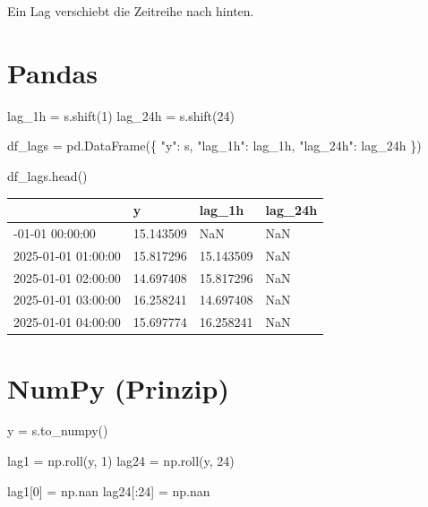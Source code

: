 \documentclass[
  ngerman,
  letterpaper,
  DIV=11]{scrreprt}
\newenvironment{Shaded}{\begin{snugshade}}{\end{snugshade}}
\newcommand{\DecValTok}[1]{\textcolor[rgb]{0.68,0.00,0.00}{#1}}
\newcommand{\NormalTok}[1]{\textcolor[rgb]{0.00,0.23,0.31}{#1}}
\newcommand{\OperatorTok}[1]{\textcolor[rgb]{0.37,0.37,0.37}{#1}}
\newcommand{\StringTok}[1]{\textcolor[rgb]{0.13,0.47,0.30}{#1}}
\begin{document}
Ein Lag verschiebt die Zeitreihe nach hinten.

\section{Pandas}

\begin{Shaded}
\begin{Highlighting}[]
\NormalTok{lag\_1h }\OperatorTok{=}\NormalTok{ s.shift(}\DecValTok{1}\NormalTok{)}
\NormalTok{lag\_24h }\OperatorTok{=}\NormalTok{ s.shift(}\DecValTok{24}\NormalTok{)}

\NormalTok{df\_lags }\OperatorTok{=}\NormalTok{ pd.DataFrame(\{}
    \StringTok{"y"}\NormalTok{: s,}
    \StringTok{"lag\_1h"}\NormalTok{: lag\_1h,}
    \StringTok{"lag\_24h"}\NormalTok{: lag\_24h}
\NormalTok{\})}

\NormalTok{df\_lags.head()}
\end{Highlighting}
\end{Shaded}

\begin{longtable}[]{@{}llll@{}}
\toprule\noalign{}
& y & lag\_1h & lag\_24h \\
\midrule\noalign{}
\endhead
\bottomrule\noalign{}
\endlastfoot
2025-01-01 00:00:00 & 15.143509 & NaN & NaN \\
2025-01-01 01:00:00 & 15.817296 & 15.143509 & NaN \\
2025-01-01 02:00:00 & 14.697408 & 15.817296 & NaN \\
2025-01-01 03:00:00 & 16.258241 & 14.697408 & NaN \\
2025-01-01 04:00:00 & 15.697774 & 16.258241 & NaN \\
\end{longtable}

\section{NumPy (Prinzip)}

\begin{Shaded}
\begin{Highlighting}[]
\NormalTok{y }\OperatorTok{=}\NormalTok{ s.to\_numpy()}

\NormalTok{lag1 }\OperatorTok{=}\NormalTok{ np.roll(y, }\DecValTok{1}\NormalTok{)}
\NormalTok{lag24 }\OperatorTok{=}\NormalTok{ np.roll(y, }\DecValTok{24}\NormalTok{)}

\NormalTok{lag1[}\DecValTok{0}\NormalTok{] }\OperatorTok{=}\NormalTok{ np.nan}
\NormalTok{lag24[:}\DecValTok{24}\NormalTok{] }\OperatorTok{=}\NormalTok{ np.nan}
\end{Highlighting}
\end{Shaded}
\end{document}
